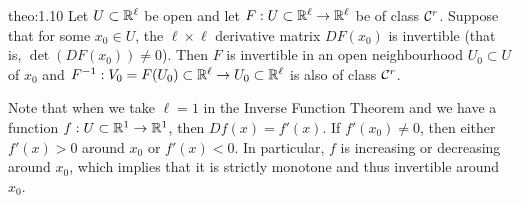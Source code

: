 \begin{theo}{theo:1.10}
    Let $U \subset \mathbb{R}^\ell$ be open and let $F : U \subset \mathbb{R}^\ell \to \mathbb{R}^\ell$ 
    be of class ${\cal C}^r$. Suppose that for some $x_0 \in U$, the $\ell \times \ell$ 
    derivative matrix $DF(x_0)$ is invertible (that is, $\det(DF(x_0)) \neq 0$). 
    Then $F$ is invertible in an open neighbourhood $U_0 \subset U$ of $x_0$ and 
    $F^{-1} : V_0 = F(U_0) \subset \mathbb{R}^\ell \to U_0 \subset \mathbb{R}^\ell$ 
    is also of class ${\cal C}^r$.
\end{theo}\vspace{-0.25cm}

Note that when we take $\ell = 1$ in the Inverse Function Theorem 
and we have a function $f : U \subset \mathbb{R}^1 \to \mathbb{R}^1$, then $Df(x) = f'(x)$. 
If $f'(x_0) \neq 0$, then either $f'(x) > 0$ around $x_0$ or $f'(x) < 0$. 
In particular, $f$ is increasing or decreasing around $x_0$, which implies 
that it is strictly monotone and thus invertible around $x_0$. 

